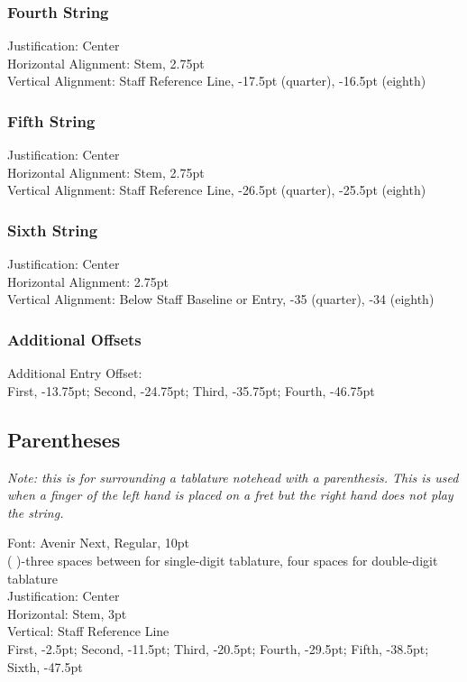 \documentclass[10pt,twoside]{article} %
\begin{document}
\subsubsection{Fourth String}
\label{sec:fourth-string}

Justification: Center\\
Horizontal Alignment: Stem, 2.75pt\\
Vertical Alignment: Staff Reference Line, -17.5pt (quarter), -16.5pt (eighth)

\subsubsection{Fifth String}
\label{sec:fifth-string}

Justification: Center\\
Horizontal Alignment: Stem, 2.75pt\\
Vertical Alignment: Staff Reference Line, -26.5pt (quarter), -25.5pt (eighth)

\subsubsection{Sixth String}
\label{sec:sixth-string}

Justification: Center\\
Horizontal Alignment: 2.75pt\\
Vertical Alignment: Below Staff Baseline or Entry, -35 (quarter), -34 (eighth)\\

\subsubsection{Additional Offsets}
\label{sec:additional-offsets}

Additional Entry Offset:\\
\indent First, -13.75pt; Second, -24.75pt; Third, -35.75pt; Fourth, -46.75pt

\subsection{Parentheses}
\label{sec:parentheses}

\emph{Note: this is for surrounding a tablature notehead with a parenthesis. This is used when a finger of the left hand is placed on a fret but the right hand does not play the string.}

Font: Avenir Next, Regular, 10pt\\
(   )-three spaces between for single-digit tablature, four spaces for double-digit tablature\\
Justification: Center\\
Horizontal: Stem, 3pt\\
Vertical: Staff Reference Line\\
\indent First, -2.5pt; Second, -11.5pt; Third, -20.5pt; Fourth, -29.5pt; Fifth, -38.5pt; Sixth, -47.5pt
\end{document}
